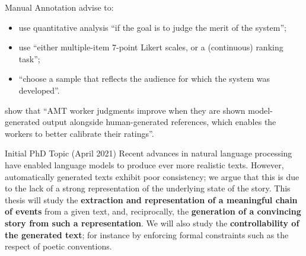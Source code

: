\begin{frame}{Manual Annotation}
    \citet{lee-etal-2019-best} advise to:
    \begin{itemize}
        \item use quantitative analysis ``if the goal is to judge the merit of the system'';
        \item use ``either multiple-item 7-point Likert scales, or a (continuous) ranking task'';
        \item ``choose a sample that reflects the audience for which the system was developed''.
    \end{itemize}
    \citet{karpinska2021perils} show that ``AMT worker judgments improve when they are shown model-generated output alongside human-generated references, which enables the workers to better calibrate their ratings''.
\end{frame}

\begin{frame}{Initial PhD Topic (April 2021)}
    Recent advances in natural language processing have enabled language models to produce ever more realistic texts. However, automatically generated texts exhibit poor consistency; we argue that this is due to the lack of a strong representation of the underlying state of the story. This thesis will study the \textbf{extraction and representation of a meaningful chain of events} from a given text, and, reciprocally, the \textbf{generation of a convincing story from such a representation}. We will also study the \textbf{controllability of the generated text}; for instance by enforcing formal constraints such as the respect of poetic conventions.
\end{frame}